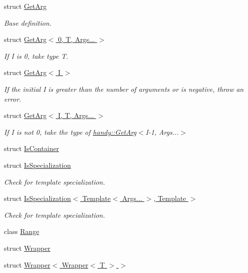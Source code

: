\begin{DoxyCompactItemize}
struct \hyperlink{structhandy_1_1GetArg}{Get\+Arg}
\begin{DoxyCompactList}\small\item\em Base definition. \end{DoxyCompactList}\item 
struct \hyperlink{structhandy_1_1GetArg_3_010_00_01T_00_01Args_8_8_8_01_4}{Get\+Arg$<$ 0, T, Args... $>$}
\begin{DoxyCompactList}\small\item\em If {\ttfamily I} is 0, take type {\ttfamily T}. \end{DoxyCompactList}\item 
struct \hyperlink{structhandy_1_1GetArg_3_01I_01_4}{Get\+Arg$<$ I $>$}
\begin{DoxyCompactList}\small\item\em If the initial {\ttfamily I} is greater than the number of arguments or is negative, throw an error. \end{DoxyCompactList}\item 
struct \hyperlink{structhandy_1_1GetArg_3_01I_00_01T_00_01Args_8_8_8_01_4}{Get\+Arg$<$ I, T, Args... $>$}
\begin{DoxyCompactList}\small\item\em If {\ttfamily I} is not 0, take the type of \hyperlink{structhandy_1_1GetArg}{handy\+::\+Get\+Arg}$<$I-\/1, Args...$>$ \end{DoxyCompactList}\item 
struct \hyperlink{structhandy_1_1IsContainer}{Is\+Container}
\item 
struct \hyperlink{structhandy_1_1IsSpecialization}{Is\+Specialization}
\begin{DoxyCompactList}\small\item\em Check for template specialization. \end{DoxyCompactList}\item 
struct \hyperlink{structhandy_1_1IsSpecialization_3_01Template_3_01Args_8_8_8_01_4_00_01Template_01_4}{Is\+Specialization$<$ Template$<$ Args... $>$, Template $>$}
\begin{DoxyCompactList}\small\item\em Check for template specialization. \end{DoxyCompactList}\item 
class \hyperlink{classhandy_1_1Range}{Range}
\item 
struct \hyperlink{structhandy_1_1Wrapper}{Wrapper}
\item 
struct \hyperlink{structhandy_1_1Wrapper_3_01Wrapper_3_01T_01_4_01_4}{Wrapper$<$ Wrapper$<$ T $>$ $>$}
\end{DoxyCompactItemize}
